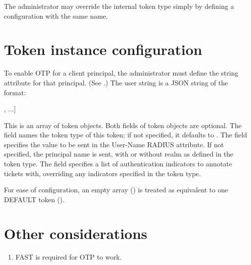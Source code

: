 \documentclass[letterpaper,10pt,english]{sphinxmanual}
\begin{document}
%
\begin{sphinxVerbatim}[commandchars=\\\{\}]
\PYG{p}{[}\PYG{p}{]}
      
          
\end{sphinxVerbatim}

The administrator may override the internal  token type
simply by defining a configuration with the same name.


\section{Token instance configuration}
\label{\detokenize{admin/otp:token-instance-configuration}}
To enable OTP for a client principal, the administrator must define
the  string attribute for that principal.  (See
{\hyperref[\detokenize{admin/admin_commands/kadmin_local:set-string}]{}}.)  The  user string is a JSON string of the
format:

%
\begin{sphinxVerbatim}[commandchars=\\\{\}]
[\PYGZob{}
    \PYGZdq{}type\PYGZdq{}: \PYG{n+nt}{\PYGZlt{}string}\PYG{n+nt}{\PYGZgt{}},
    \PYGZdq{}username\PYGZdq{}: \PYG{n+nt}{\PYGZlt{}string}\PYG{n+nt}{\PYGZgt{}},
    \PYGZdq{}indicators\PYGZdq{}: [\PYG{n+nt}{\PYGZlt{}string}\PYG{n+nt}{\PYGZgt{}}, ...]
 \PYGZcb{}, ...]
\end{sphinxVerbatim}

This is an array of token objects.  Both fields of token objects are
optional.  The  field names the token type of this token; if
not specified, it defaults to .  The  field
specifies the value to be sent in the User-Name RADIUS attribute.  If
not specified, the principal name is sent, with or without realm as
defined in the token type.  The  field specifies a list
of authentication indicators to annotate tickets with, overriding any
indicators specified in the token type.

For ease of configuration, an empty array (\sphinxcode{{[}{]}}) is treated as
equivalent to one DEFAULT token (\sphinxcode{{[}\{\}{]}}).


\section{Other considerations}
\label{\detokenize{admin/otp:other-considerations}}\begin{enumerate}
\item {} 
FAST is required for OTP to work.

\end{enumerate}
\end{document}
